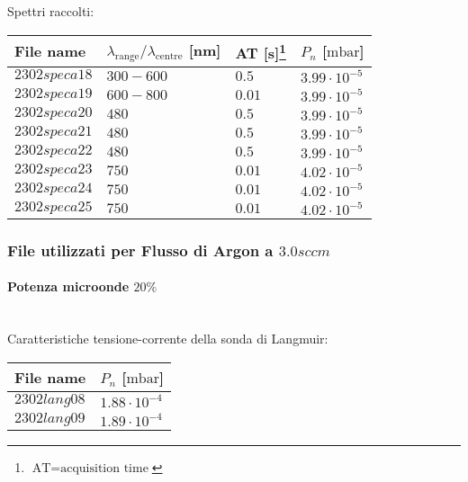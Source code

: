Spettri raccolti:
\begin{center}
\begin{tabular}{p{3cm}p{4cm}p{2cm}p{3cm}}
\toprule
File name	&$\lambda_\text{range}\text{/}\lambda_\text{centre}$ [nm] 	&AT [s]\footnote{$\text{AT}=\text{acquisition time}$} &$P_n$ [$\si{\milli\bar}$]\\
\midrule
$2302speca18$	&$300-600$	&$0.5$		&$3.99\cdot10^{-5}$\\
$2302speca19$	&$600-800$	&$0.01$		&$3.99\cdot10^{-5}$\\
$2302speca20$	&$480$		&$0.5$		&$3.99\cdot10^{-5}$\\
$2302speca21$	&$480$		&$0.5$		&$3.99\cdot10^{-5}$\\
$2302speca22$	&$480$		&$0.5$		&$3.99\cdot10^{-5}$\\
$2302speca23$	&$750$		&$0.01$		&$4.02\cdot10^{-5}$\\
$2302speca24$	&$750$		&$0.01$		&$4.02\cdot10^{-5}$\\
$2302speca25$	&$750$		&$0.01$		&$4.02\cdot10^{-5}$\\
\bottomrule
\end{tabular}
\end{center}



\subsubsection{File utilizzati per Flusso di Argon a $3.0sccm$}

\paragraph*{Potenza microonde $\text{20\%}$} ~\\
Caratteristiche tensione-corrente della sonda di Langmuir:
\begin{center}
\begin{tabular}{p{3cm}p{3cm}}
\toprule
File name	&$P_{n}$ [$\si{\milli\bar}$]\\
\midrule
$2302lang08$	&$1.88\cdot10^{-4}$\\
$2302lang09$	&$1.89\cdot10^{-4}$\\
\bottomrule
\end{tabular}
\end{center}

